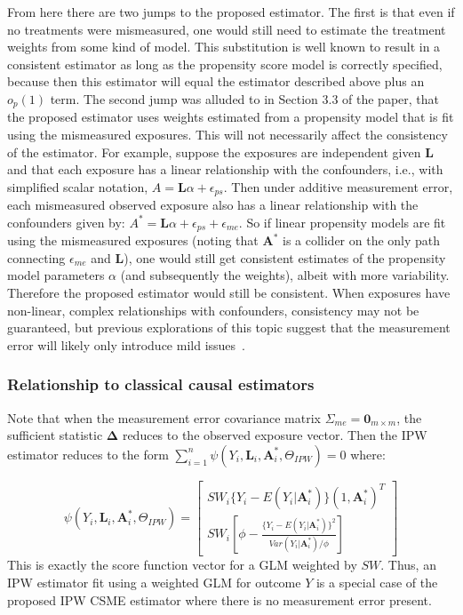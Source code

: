 \documentclass[12pt]{article}
\begin{document}
From here there are two jumps to the proposed estimator. The first is that even if no treatments were mismeasured, one would still need to estimate the treatment weights from some kind of model. This substitution is well known to result in a consistent estimator as long as the propensity score model is correctly specified, because then this estimator will equal the estimator described above plus an $o_{p}(1)$ term. The second jump was alluded to in Section 3.3 of the paper, that the proposed estimator uses weights estimated from a propensity model that is fit using the mismeasured exposures. This will not necessarily affect the consistency of the estimator. For example, suppose the exposures are independent given $\bm{L}$ and that each exposure has a linear relationship with the confounders, i.e., with simplified scalar notation, $A = \bm{L} \alpha + \epsilon_{ps}$. Then under additive measurement error, each mismeasured observed exposure also has a linear relationship with the confounders given by: $A^{*} = \bm{L} \alpha + \epsilon_{ps} + \epsilon_{me}$. So if linear propensity models are fit using the mismeasured exposures (noting that $\bm{A}^{*}$ is a collider on the only path connecting $\epsilon_{me}$ and $\bm{L}$), one would still get consistent estimates of the propensity model parameters $\alpha$ (and subsequently the weights), albeit with more variability. Therefore the proposed estimator would still be consistent. When exposures have non-linear, complex relationships with confounders, consistency may not be guaranteed, but previous explorations of this topic suggest that the measurement error will likely only introduce mild issues~\citep{carroll2006}.

\subsubsection{Relationship to classical causal estimators}

Note that when the measurement error covariance matrix $\Sigma_{me} = \textbf{0}_{m \times m}$, the sufficient statistic $\bm{\Delta}$ reduces to the observed exposure vector. Then the IPW estimator reduces to the form $\sum_{i=1}^{n} \psi(Y_{i}, \bm{L}_{i}, \bm{A}^{*}_{i}, \Theta_{IPW}) = 0$ where:

\begin{equation*}
    \psi(Y_{i}, \bm{L}_{i}, \bm{A}^{*}_{i}, \Theta_{IPW}) =
    \begin{bmatrix}
       SW_{i}\{ Y_{i} - E(Y_{i} | \bm{A}^{*}_{i}) \} (1, \bm{A}^{*}_{i})^{T} \\
       SW_{i} \left [ \phi - \frac{ \{Y_{i} - E(Y_{i} | \bm{A}^{*}_{i}) \}^{2}}{Var(Y_{i} | \bm{A}^{*}_{i}) / \phi} \right ]
    \end{bmatrix}
\end{equation*}
This is exactly the score function vector for a GLM weighted by $SW$. Thus, an IPW estimator fit using a weighted GLM for outcome $Y$ is a special case of the proposed IPW CSME estimator where there is no measurement error present.
\end{document}

